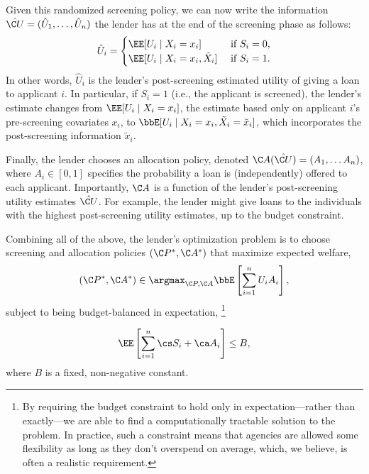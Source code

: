 \documentclass[10pt]{article}
\begin{document}
\begin{ReviewVerbatim}
Given this randomized screening policy, we can now write the information \(\hat {\C U} = (\hat U_1, \ldots, \hat U_n)\) the lender has at the end of the screening phase as follows:
    \begin{equation}
        \hat U_i = \begin{cases}
            \EE[U_i \mid X_i = x_i] & \text{ if } S_i = 0, \\
            \EE[U_i \mid X_i = x_i, \tilde{X}_i] & \text{ if } S_i =1.
        \end{cases}
    \end{equation}
In other words, \(\hat U_i\) is the lender's post-screening estimated utility of giving a loan to applicant \(i\).
In particular, if \(S_i = 1\) (i.e., the applicant is screened), the lender's estimate changes from \(\EE[U_i\mid X_i = x_i]\),
the estimate based only on applicant \(i\)'s pre-screening covariates \(x_i\),
to
\(\bbE[U_i \mid X_i = x_i, \tilde{X}_i = \tilde{x}_i] \), which incorporates the post-screening information \(\tilde{x}_i\).

Finally, the lender chooses an allocation policy, denoted \(\C A(\hat {\C U}) = (A_1, \dots A_n)\),
where \(A_i \in [0,1]\)
specifies the probability a loan is (independently) offered to each applicant.
Importantly, \(\C A\) is a function of
the lender's post-screening utility estimates
\(\hat {\C U}\).
For example, the lender might give loans to the individuals with the highest post-screening utility estimates, up to the budget constraint.

Combining all of the above, the lender's optimization problem is to choose screening and allocation policies \((\C P^*, \C A^*)\) that maximize expected welfare,
\begin{equation}
\label{eq:def1}
    (\C P^*, \C A^*) \in \argmax_{\C P, \C A} \bbE\left[\sum_{i = 1}^n U_i A_i\right],
\end{equation}
subject to being budget-balanced in expectation,%
\footnote{By requiring the budget constraint to hold only in expectation---rather than exactly---we are able to find a computationally tractable solution to the problem. In practice, such a constraint means that agencies are allowed some flexibility as long as they don't overspend on average,
which, we believe, is often a realistic requirement.
}

\begin{equation}
\label{eq:def2}
    \EE \left[ \sum_{i = 1}^n \cs S_i + \ca  A_i \right] \leq B,
\end{equation}
where \(B\) is a fixed, non-negative constant.


\end{ReviewVerbatim}
\end{document}

